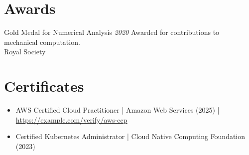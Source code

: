 \documentclass[letterpaper]{moderncv}        %
\begin{document}
      \section{Awards}
      \cventry
  {}
  {Gold Medal for Numerical Analysis}
  {}
  {\textit{2020}}
  {}
  {Awarded for contributions to mechanical computation.\\Royal Society}
\vspace{1mm}
\vspace{3pt}
\section{Certificates}
\begin{itemize}
\setlength\itemsep{2pt}
\item AWS Certified Cloud Practitioner | Amazon Web Services (2025) | \href{https://example.com/verify/aws-ccp}{https://example.com/verify/aws-ccp}
\item Certified Kubernetes Administrator | Cloud Native Computing Foundation (2023)
\end{itemize}
    \ 
    
\end{document}
